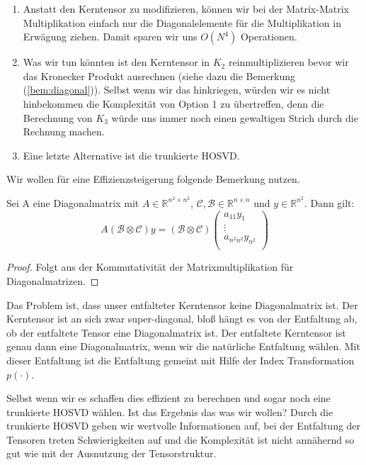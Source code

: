 \begin{enumerate}
\item Anstatt den Kerntensor zu modifizieren, können wir bei der Matrix-Matrix Multiplikation einfach nur die Diagonalelemente für die Multiplikation in Erwägung ziehen. Damit sparen wir uns $O(N^4)$ Operationen.

\item Was wir tun könnten ist den Kerntensor in $K_2$ reinmultiplizieren bevor wir das Kronecker Produkt ausrechnen (siehe dazu die Bemerkung (\ref{bem:diagonal})). Selbst wenn wir das hinkriegen, würden wir es nicht hinbekommen die Komplexität von Option 1 zu übertreffen, denn die Berechnung von $K_3$ würde uns immer noch einen gewaltigen Strich durch die Rechnung machen.

\item Eine letzte Alternative ist die trunkierte HOSVD.

\end{enumerate} 

Wir wollen für eine Effizienzsteigerung folgende Bemerkung nutzen.

\begin{Bemerkung} \label{bem:diagonal}
Sei A eine Diagonalmatrix mit $A \in \mathbb{R}^{n^2 \times n^2}$, $\mathcal{C},\mathcal{B} \in \mathbb{R}^{n \times n}$ und $y \in \mathbb{R}^{n^2}$. Dann gilt:
\begin{equation*}
A(\mathcal{B} \otimes \mathcal{C})y = (\mathcal{B} \otimes \mathcal{C}) 
\begin{pmatrix}
a_{11} y_1 \\ \vdots \\ a_{n^2 n^2} y_{n^2} \\
\end{pmatrix}
\end{equation*}
\begin{proof}
Folgt aus der Kommutativität der Matrixmultiplikation für Diagonalmatrizen.
\end{proof}
\end{Bemerkung}


Das Problem ist, dass unser entfalteter Kerntensor keine Diagonalmatrix ist. Der Kerntensor ist an sich zwar super-diagonal, bloß hängt es von der Entfaltung ab, ob der entfaltete Tensor eine Diagonalmatrix ist. 
Der entfaltete Kerntensor ist genau dann eine Diagonalmatrix, wenn wir die natürliche Entfaltung wählen. Mit dieser Entfaltung ist die Entfaltung gemeint mit Hilfe der Index Transformation $p(\cdot)$.

Selbst wenn wir es schaffen dies effizient zu berechnen und sogar noch eine trunkierte HOSVD wählen. Ist das Ergebnis das was wir wollen? Durch die trunkierte HOSVD geben wir wertvolle Informationen auf, bei der Entfaltung der Tensoren treten Schwierigkeiten auf und die Komplexität ist nicht annähernd so gut wie mit der Ausnutzung der Tensorstruktur.

